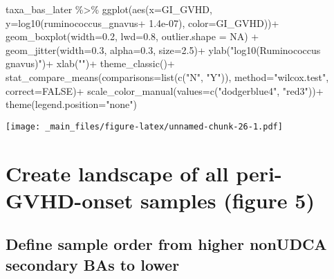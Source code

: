 \documentclass[
]{book}
\newenvironment{Shaded}{\begin{snugshade}}{\end{snugshade}}
\newcommand{\AttributeTok}[1]{\textcolor[rgb]{0.77,0.63,0.00}{#1}}
\newcommand{\ConstantTok}[1]{\textcolor[rgb]{0.00,0.00,0.00}{#1}}
\newcommand{\FloatTok}[1]{\textcolor[rgb]{0.00,0.00,0.81}{#1}}
\newcommand{\FunctionTok}[1]{\textcolor[rgb]{0.00,0.00,0.00}{#1}}
\newcommand{\NormalTok}[1]{#1}
\newcommand{\SpecialCharTok}[1]{\textcolor[rgb]{0.00,0.00,0.00}{#1}}
\newcommand{\StringTok}[1]{\textcolor[rgb]{0.31,0.60,0.02}{#1}}
\begin{document}
\begin{Shaded}
\begin{Highlighting}[]
\NormalTok{taxa\_bas\_later }\SpecialCharTok{\%\textgreater{}\%} 
  \FunctionTok{ggplot}\NormalTok{(}\FunctionTok{aes}\NormalTok{(}\AttributeTok{x=}\NormalTok{GI\_GVHD, }\AttributeTok{y=}\FunctionTok{log10}\NormalTok{(ruminococcus\_gnavus}\SpecialCharTok{+} \FloatTok{1.4e{-}07}\NormalTok{), }\AttributeTok{color=}\NormalTok{GI\_GVHD))}\SpecialCharTok{+}
  \FunctionTok{geom\_boxplot}\NormalTok{(}\AttributeTok{width=}\FloatTok{0.2}\NormalTok{, }\AttributeTok{lwd=}\FloatTok{0.8}\NormalTok{, }\AttributeTok{outlier.shape =} \ConstantTok{NA}\NormalTok{) }\SpecialCharTok{+}
  \FunctionTok{geom\_jitter}\NormalTok{(}\AttributeTok{width=}\FloatTok{0.3}\NormalTok{, }\AttributeTok{alpha=}\FloatTok{0.3}\NormalTok{, }\AttributeTok{size=}\FloatTok{2.5}\NormalTok{)}\SpecialCharTok{+}
  \FunctionTok{ylab}\NormalTok{(}\StringTok{"log10(Ruminococcus gnavus)"}\NormalTok{)}\SpecialCharTok{+}
  \FunctionTok{xlab}\NormalTok{(}\StringTok{""}\NormalTok{)}\SpecialCharTok{+}
  \FunctionTok{theme\_classic}\NormalTok{()}\SpecialCharTok{+}
  \FunctionTok{stat\_compare\_means}\NormalTok{(}\AttributeTok{comparisons=}\FunctionTok{list}\NormalTok{(}\FunctionTok{c}\NormalTok{(}\StringTok{"N"}\NormalTok{, }\StringTok{"Y"}\NormalTok{)),}
                     \AttributeTok{method=}\StringTok{"wilcox.test"}\NormalTok{,}
                     \AttributeTok{correct=}\ConstantTok{FALSE}\NormalTok{)}\SpecialCharTok{+}
  \FunctionTok{scale\_color\_manual}\NormalTok{(}\AttributeTok{values=}\FunctionTok{c}\NormalTok{(}\StringTok{"dodgerblue4"}\NormalTok{, }\StringTok{"red3"}\NormalTok{))}\SpecialCharTok{+}
  \FunctionTok{theme}\NormalTok{(}\AttributeTok{legend.position=}\StringTok{"none"}\NormalTok{)}
\end{Highlighting}
\end{Shaded}

\texttt{[image: \_main\_files/figure-latex/unnamed-chunk-26-1.pdf]}

\hypertarget{create-landscape-of-all-peri-gvhd-onset-samples-figure-5}{%
\chapter{Create landscape of all peri-GVHD-onset samples (figure 5)}\label{create-landscape-of-all-peri-gvhd-onset-samples-figure-5}}

\hypertarget{define-sample-order-from-higher-nonudca-secondary-bas-to-lower}{%
\section{Define sample order from higher nonUDCA secondary BAs to lower}\label{define-sample-order-from-higher-nonudca-secondary-bas-to-lower}}
\end{document}
